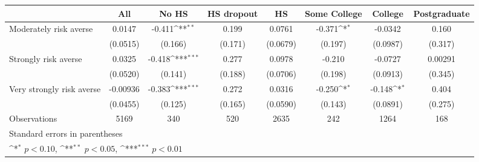 {
\def\sym#1{\ifmmode^{#1}\else\(^{#1}\)\fi}
\begin{tabular}{l*{7}{c}}
\toprule
                    &\multicolumn{1}{c}{All}&\multicolumn{1}{c}{No HS}&\multicolumn{1}{c}{HS dropout}&\multicolumn{1}{c}{HS}&\multicolumn{1}{c}{Some College}&\multicolumn{1}{c}{College}&\multicolumn{1}{c}{Postgraduate}\\
\midrule
Moderately risk averse&      0.0147         &      -0.411\sym{**} &       0.199         &      0.0761         &      -0.371\sym{*}  &     -0.0342         &       0.160         \\
                    &    (0.0515)         &     (0.166)         &     (0.171)         &    (0.0679)         &     (0.197)         &    (0.0987)         &     (0.317)         \\
\addlinespace
Strongly risk averse&      0.0325         &      -0.418\sym{***}&       0.277         &      0.0978         &      -0.210         &     -0.0727         &     0.00291         \\
                    &    (0.0520)         &     (0.141)         &     (0.188)         &    (0.0706)         &     (0.198)         &    (0.0913)         &     (0.345)         \\
\addlinespace
Very strongly risk averse&    -0.00936         &      -0.383\sym{***}&       0.272         &      0.0316         &      -0.250\sym{*}  &      -0.148\sym{*}  &       0.404         \\
                    &    (0.0455)         &     (0.125)         &     (0.165)         &    (0.0590)         &     (0.143)         &    (0.0891)         &     (0.275)         \\
\midrule
Observations        &        5169         &         340         &         520         &        2635         &         242         &        1264         &         168         \\
\bottomrule
\multicolumn{8}{l}{\footnotesize Standard errors in parentheses}\\
\multicolumn{8}{l}{\footnotesize \sym{*} \(p<0.10\), \sym{**} \(p<0.05\), \sym{***} \(p<0.01\)}\\
\end{tabular}
}
